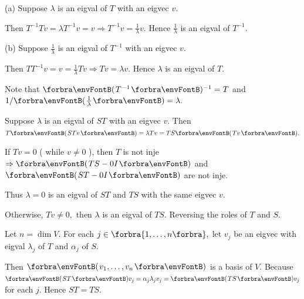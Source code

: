 \documentclass[a4paper, 11pt, UTF8]{article}
\begin{document}
\begin{large}
\par\quad
(a) Suppose $\lambda$ is an eigval of $T$ with an eigvec $v.$\par\quad\Ha
Then $T^{-1}Tv=\lambda T^{-1}v=v\Rightarrow T^{-1}v=\frac{1}{\lambda}v.$ Hence $\frac{1}{\lambda}$ is an eigval of $T^{-1}.$\par\quad
(b) Suppose $\frac{1}{\lambda}$ is an eigval of $T^{-1}$ with an eigvec $v.$\par\quad\Hb
Then $TT^{-1}v=v=\frac{1}{\lambda}Tv\Rightarrow Tv=\lambda v.$ Hence $\lambda$ is an eigval of $T.$\par\quad\Hb
\Or Note that $\Par{T^{-1}}{^{-1}}=T$ and $1/\Par{\frac{1}{\lambda}}=\lambda.$\PfEnd
\SepLine

\par\quad
Suppose $\lambda$ is an eigval of $ST$ with an eigvec $v.$ Then $T\Par{STv}=\lambda Tv=TS\Par{Tv}.$\par\quad
If $Tv=0$ ( while $v\neq 0$ ), then $T$ is not inje $\Rightarrow\Par{TS-0I}$ and $\Par{ST-0I}$ are not inje.\par\quad
Thus $\lambda=0$ is an eigval of $ST$ and $TS$ with the same eigvec $v$.\par\quad
Otherwise, $Tv\neq 0,$ then $\lambda$ is an eigval of $TS.$ Reversing the roles of $T$ and $S.$\PfEnd
\SepLine

\par\quad
Let $n=\dim V.$ For each $j\in\Bra{1,\dots,n},$ let $v_j$ be an eigvec with eigval $\lambda_j$ of $T$ and $\alpha_j$ of $S$.\par\quad
Then $\Par{v_1,\dots,v_n}$ is a basis of $V.$ Because $\Par{ST}v_j=\alpha_j\lambda_j v_j=\Par{TS}v_j$ for each $j.$ Hence $ST=TS.$\PfEnd
\SepLine



\end{large}
\end{document}
